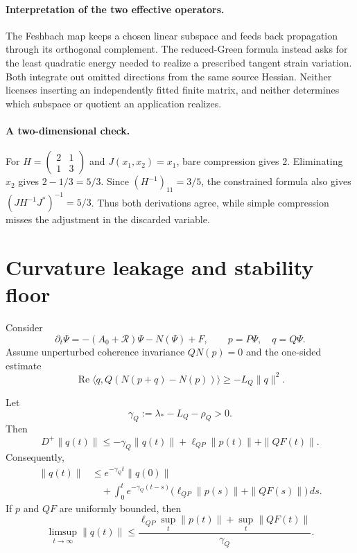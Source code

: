 \documentclass[11pt]{article}
\begin{document}
\paragraph{Interpretation of the two effective operators.}
The Feshbach map keeps a chosen linear subspace and feeds back propagation
through its orthogonal complement.  The reduced-Green formula instead asks
for the least quadratic energy needed to realize a prescribed tangent strain
variation.  Both integrate out omitted directions from the same source
Hessian. Neither licenses inserting an independently fitted finite matrix,
and neither determines which subspace or quotient an application realizes.

\paragraph{A two-dimensional check.}
For $H=\left(\begin{smallmatrix}2&1\\1&3\end{smallmatrix}\right)$ and
$J(x_1,x_2)=x_1$, bare compression gives $2$. Eliminating $x_2$ gives
$2-1/3=5/3$. Since $(H^{-1})_{11}=3/5$, the constrained formula also gives
$(JH^{-1}J^\ast)^{-1}=5/3$. Thus both derivations agree, while simple
compression misses the adjustment in the discarded variable.

\section{Curvature leakage and stability floor}

Consider
\[
\partial_t\Psi=-(A_0+\mathcal R)\Psi-N(\Psi)+F,
\qquad p=P\Psi,\quad q=Q\Psi.
\]
Assume unperturbed coherence invariance $QN(p)=0$ and the one-sided estimate
\[
\operatorname{Re}\langle q,Q(N(p+q)-N(p))\rangle
\ge-L_Q\|q\|^2.
\]

\begin{theorem}\label{thm:leakage}
Let
\[
\gamma_Q:=\lambda_\ast-L_Q-\rho_Q>0.
\]
Then
\begin{equation}
D^+\|q(t)\|
\le-\gamma_Q\|q(t)\|+\ell_{QP}\|p(t)\|+\|QF(t)\|.
\label{eq:leakage-dini}
\end{equation}
Consequently,
\begin{align}
\|q(t)\|
&\le e^{-\gamma_Qt}\|q(0)\|\\
&\quad+\int_0^t e^{-\gamma_Q(t-s)}
\bigl(\ell_{QP}\|p(s)\|+\|QF(s)\|\bigr)\,ds.
\end{align}
If $p$ and $QF$ are uniformly bounded, then
\[
\limsup_{t\to\infty}\|q(t)\|
\le\frac{\ell_{QP}\sup_t\|p(t)\|+\sup_t\|QF(t)\|}{\gamma_Q}.
\]
\end{theorem}
\end{document}
